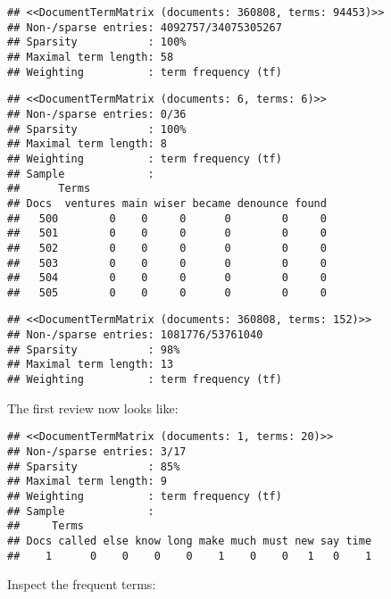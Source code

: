 \documentclass[
]{article}
\begin{document}
\begin{verbatim}
## <<DocumentTermMatrix (documents: 360808, terms: 94453)>>
## Non-/sparse entries: 4092757/34075305267
## Sparsity           : 100%
## Maximal term length: 58
## Weighting          : term frequency (tf)
\end{verbatim}

\begin{verbatim}
## <<DocumentTermMatrix (documents: 6, terms: 6)>>
## Non-/sparse entries: 0/36
## Sparsity           : 100%
## Maximal term length: 8
## Weighting          : term frequency (tf)
## Sample             :
##      Terms
## Docs  ventures main wiser became denounce found
##   500        0    0     0      0        0     0
##   501        0    0     0      0        0     0
##   502        0    0     0      0        0     0
##   503        0    0     0      0        0     0
##   504        0    0     0      0        0     0
##   505        0    0     0      0        0     0
\end{verbatim}

\begin{verbatim}
## <<DocumentTermMatrix (documents: 360808, terms: 152)>>
## Non-/sparse entries: 1081776/53761040
## Sparsity           : 98%
## Maximal term length: 13
## Weighting          : term frequency (tf)
\end{verbatim}

The first review now looks like:

\begin{verbatim}
## <<DocumentTermMatrix (documents: 1, terms: 20)>>
## Non-/sparse entries: 3/17
## Sparsity           : 85%
## Maximal term length: 9
## Weighting          : term frequency (tf)
## Sample             :
##     Terms
## Docs called else know long make much must new say time
##    1      0    0    0    0    1    0    0   1   0    1
\end{verbatim}

Inspect the frequent terms:
\end{document}
